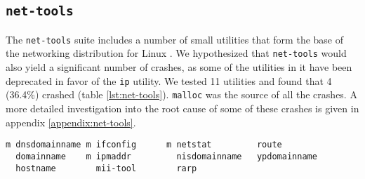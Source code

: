 \subsection{\texttt{net-tools}}
The \texttt{net-tools} suite includes a number of small utilities that form the base of the networking distribution for Linux \cite{nettools}. We hypothesized that \texttt{net-tools} would also yield a significant number of crashes, as some of the utilities in it have been deprecated in favor of the \texttt{ip} utility. We tested 11 utilities and found that 4 (36.4\%) crashed (table \ref{lst:net-tools}). \texttt{malloc} was the source of all  the crashes. A more detailed investigation into the root cause of some of these crashes is given in appendix \ref{appendix:net-tools}.

\PreTable
\begin{lstlisting}[label={lst:net-tools},caption={\texttt{net-tools} utilities tested; those which crashed with \texttt{malloc} are indicated with a \texttt{m} to their left. A total of 4/11 (36.4\%) crashed.}]
m dnsdomainname m ifconfig      m netstat         route
  domainname    m ipmaddr         nisdomainname   ypdomainname
  hostname        mii-tool        rarp
\end{lstlisting}
\PostTable